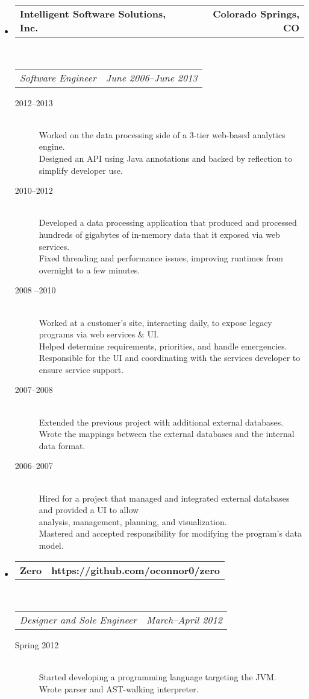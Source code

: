 \documentclass[10pt,letterpaper]{article}
\makeatletter
\newcommand{\headerrow}[2]
{\begin{tabular*}{\linewidth}{l@{\extracolsep{\fill}}r}
  #1 &
  #2 \\
\end{tabular*}}
\makeatother
\begin{document}
\begin{itemize}
  \item
  \headerrow
    {\textbf{Intelligent Software Solutions, Inc.}}
    {\textbf{Colorado Springs, CO}}
  \\
  \headerrow
    {\emph{Software Engineer}}
    {\emph{June 2006--June 2013}}
  \begin{description}
    \item[2012--2013] \hfill \\
        Worked on the data processing side of a 3-tier web-based analytics engine. \\
        Designed an API using Java annotations and backed by reflection to simplify developer use.
    \item[2010--2012] \hfill \\
        Developed a data processing application that produced and processed hundreds of gigabytes of in-memory data that it exposed via web services. \\
        Fixed threading and performance issues, improving runtimes from overnight to a few minutes.
    \item[2008 --2010] \hfill \\
        Worked at a customer’s site, interacting daily, to expose legacy programs via web services \& UI. \\
        Helped determine requirements, priorities, and handle emergencies. \\
        Responsible for the UI and coordinating with the services developer to ensure service support.
    \item[2007--2008] \hfill \\
        Extended the previous project with additional external databases. \\
        Wrote the mappings between the external databases and the internal data format.
    \item[2006--2007] \hfill \\
        Hired for a project that managed and integrated external databases and provided a UI to allow \\ analysis, management, planning, and visualization. \\
        Mastered and accepted responsibility for modifying the program’s data model.
  \end{description}

  \item
  \headerrow
    {\textbf{Zero}}
    {\textbf{https://github.com/oconnor0/zero}}
  \\
  \headerrow
    {\emph{Designer and Sole Engineer}}
    {\emph{March--April 2012}}
  \begin{description}
    \item[Spring 2012] \hfill \\
      Started developing a programming language targeting the JVM. \\
      Wrote parser and AST-walking interpreter.
   \end{description}


\end{itemize}
\end{document}
